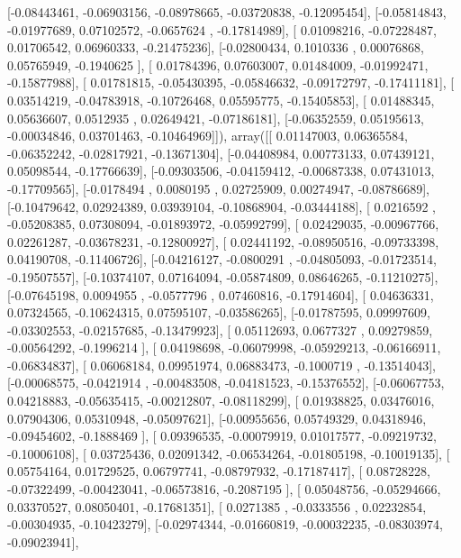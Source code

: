 \documentclass{article}
\begin{document}
       [-0.08443461, -0.06903156, -0.08978665, -0.03720838, -0.12095454],
       [-0.05814843, -0.01977689,  0.07102572, -0.0657624 , -0.17814989],
       [ 0.01098216, -0.07228487,  0.01706542,  0.06960333, -0.21475236],
       [-0.02800434,  0.1010336 ,  0.00076868,  0.05765949, -0.1940625 ],
       [ 0.01784396,  0.07603007,  0.01484009, -0.01992471, -0.15877988],
       [ 0.01781815, -0.05430395, -0.05846632, -0.09172797, -0.17411181],
       [ 0.03514219, -0.04783918, -0.10726468,  0.05595775, -0.15405853],
       [ 0.01488345,  0.05636607,  0.0512935 ,  0.02649421, -0.07186181],
       [-0.06352559,  0.05195613, -0.00034846,  0.03701463, -0.10464969]]), array([[ 0.01147003,  0.06365584, -0.06352242, -0.02817921, -0.13671304],
       [-0.04408984,  0.00773133,  0.07439121,  0.05098544, -0.17766639],
       [-0.09303506, -0.04159412, -0.00687338,  0.07431013, -0.17709565],
       [-0.0178494 ,  0.0080195 ,  0.02725909,  0.00274947, -0.08786689],
       [-0.10479642,  0.02924389,  0.03939104, -0.10868904, -0.03444188],
       [ 0.0216592 , -0.05208385,  0.07308094, -0.01893972, -0.05992799],
       [ 0.02429035, -0.00967766,  0.02261287, -0.03678231, -0.12800927],
       [ 0.02441192, -0.08950516, -0.09733398,  0.04190708, -0.11406726],
       [-0.04216127, -0.0800291 , -0.04805093, -0.01723514, -0.19507557],
       [-0.10374107,  0.07164094, -0.05874809,  0.08646265, -0.11210275],
       [-0.07645198,  0.0094955 , -0.0577796 ,  0.07460816, -0.17914604],
       [ 0.04636331,  0.07324565, -0.10624315,  0.07595107, -0.03586265],
       [-0.01787595,  0.09997609, -0.03302553, -0.02157685, -0.13479923],
       [ 0.05112693,  0.0677327 ,  0.09279859, -0.00564292, -0.1996214 ],
       [ 0.04198698, -0.06079998, -0.05929213, -0.06166911, -0.06834837],
       [ 0.06068184,  0.09951974,  0.06883473, -0.1000719 , -0.13514043],
       [-0.00068575, -0.0421914 , -0.00483508, -0.04181523, -0.15376552],
       [-0.06067753,  0.04218883, -0.05635415, -0.00212807, -0.08118299],
       [ 0.01938825,  0.03476016,  0.07904306,  0.05310948, -0.05097621],
       [-0.00955656,  0.05749329,  0.04318946, -0.09454602, -0.1888469 ],
       [ 0.09396535, -0.00079919,  0.01017577, -0.09219732, -0.10006108],
       [ 0.03725436,  0.02091342, -0.06534264, -0.01805198, -0.10019135],
       [ 0.05754164,  0.01729525,  0.06797741, -0.08797932, -0.17187417],
       [ 0.08728228, -0.07322499, -0.00423041, -0.06573816, -0.2087195 ],
       [ 0.05048756, -0.05294666,  0.03370527,  0.08050401, -0.17681351],
       [ 0.0271385 , -0.0333556 ,  0.02232854, -0.00304935, -0.10423279],
       [-0.02974344, -0.01660819, -0.00032235, -0.08303974, -0.09023941],
\end{document}

